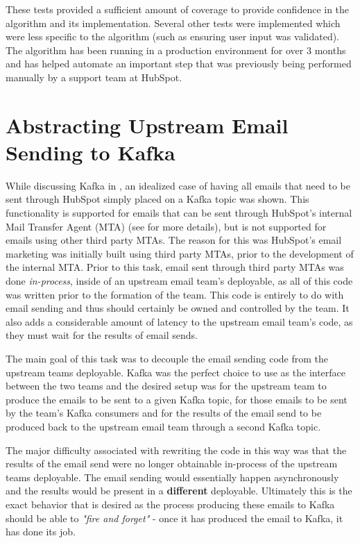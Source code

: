 These tests provided a sufficient amount of coverage to provide confidence in the algorithm and its implementation. Several other tests were implemented which were less specific to the algorithm (such as ensuring user input was validated). The algorithm has been running in a production environment for over 3 months and has helped automate an important step that was previously being performed manually by a support team at HubSpot.   

\section{Abstracting Upstream Email Sending to Kafka}
While discussing Kafka in , an idealized case of having all emails that need to be sent through HubSpot simply placed on a Kafka topic was shown. This functionality is supported for emails that can be sent through HubSpot's internal Mail Transfer Agent (MTA) (see  for more details), but is not supported for emails using other third party MTAs. The reason for this was HubSpot's email marketing was initially built using third party MTAs, prior to the development of the internal MTA. Prior to this task, email sent through third party MTAs was done \textit{in-process}, inside of an upstream email team's deployable, as all of this code was written prior to the formation of the \team{} team. This code is entirely to do with email sending and thus should certainly be owned and controlled by the \team{} team. It also adds a considerable amount of latency to the upstream email team's code, as they must wait for the results of email sends. 

The main goal of this task was to decouple the email sending code from the upstream teams deployable. Kafka was the perfect choice to use as the interface between the two teams and the desired setup was for the upstream team to produce the emails to be sent to a given Kafka topic, for those emails to be sent by the \team{} team's Kafka consumers and for the results of the email send to be produced back to the upstream email team through a second Kafka topic.

The major difficulty associated with rewriting the code in this way was that the results of the email send were no longer obtainable in-process of the upstream teams deployable. The email sending would essentially happen asynchronously and the results would be present in a \textbf{different} deployable. Ultimately this is the exact behavior that is desired as the process producing these emails to Kafka should be able to \textit{"fire and forget"} - once it has produced the email to Kafka, it has done its job.

